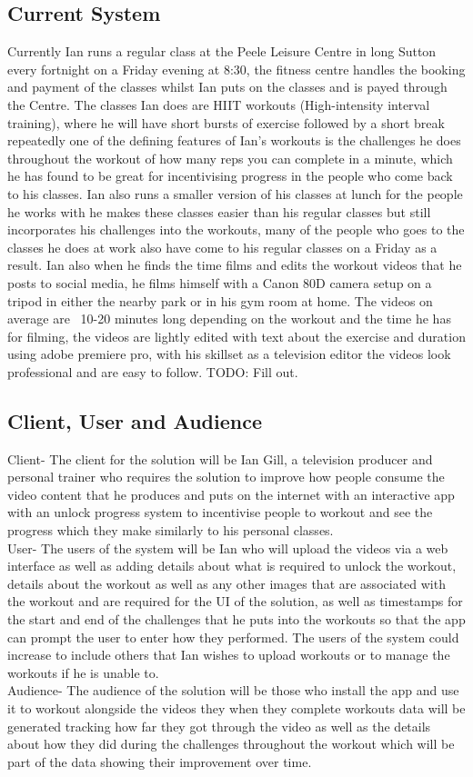 \documentclass[a4paper]{article}
\begin{document}
	\subsection{Current System}
	Currently Ian runs a regular class at the Peele Leisure Centre in long Sutton every fortnight on a Friday evening at 8:30, the fitness centre handles the booking and payment of the classes whilst Ian puts on the classes and is payed through the Centre. The classes Ian does are HIIT workouts (High-intensity interval training), where he will have short bursts of exercise followed by a short break repeatedly one of the defining features of Ian’s workouts is the challenges he does throughout the workout of how many reps you can complete in a minute, which he has found to be great for incentivising progress in the people who come back to his classes. Ian also runs a smaller version of his classes at lunch for the people he works with he makes these classes easier than his regular classes but still incorporates his challenges into the workouts, many of the people who goes to the classes he does at work also have come to his regular classes on a Friday as a result. Ian also when he finds the time films and edits the workout videos that he posts to social media, he films himself with a Canon 80D camera setup on a tripod in either the nearby park or in his gym room at home. The videos on average are ~10-20 minutes long depending on the workout and the time he has for filming, the videos are lightly edited with text about the exercise and duration using adobe premiere pro, with his skillset as a television editor the videos look professional and are easy to follow.
TODO: Fill out.

	\subsection{Client, User and Audience}
	Client- The client for the solution will be Ian Gill, a television producer and personal trainer who requires the solution to improve how people consume the video content that he produces and puts on the internet with an interactive app with an unlock progress system to incentivise people to workout and see the progress which they make similarly to his personal classes. \\
User- The users of the system will be Ian who will upload the videos via a web interface as well as adding details about what is required to unlock the workout, details about the workout as well as any other images that are associated with the workout and are required for the UI of the solution, as well as timestamps for the start and end of the challenges that he puts into the workouts so that the app can prompt the user to enter how they performed. The users of the system could increase to include others that Ian wishes to upload workouts or to manage the workouts if he is unable to. \\
Audience- The audience of the solution will be those who install the app and use it to workout alongside the videos they when they complete workouts data will be generated tracking how far they got through the video as well as the details about how they did during the challenges throughout the workout which will be part of the data showing their improvement over time.
\end{document}
